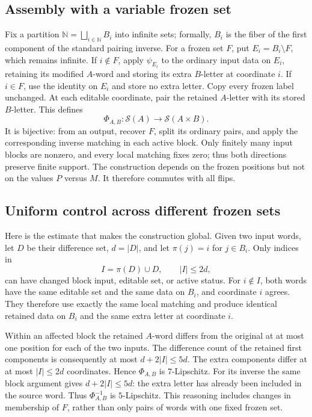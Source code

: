 \documentclass[11pt]{article}
\newcommand{\N}{\mathbb N}
\begin{document}
\subsection{Assembly with a variable frozen set}
Fix a partition $\N=\bigsqcup_{i\in\N}B_i$ into infinite sets; formally,
$B_i$ is the fiber of the first component of the standard pairing inverse.
For a frozen set $F$, put $E_i=B_i\setminus F$, which remains infinite.
If $i\notin F$, apply $\psi_{E_i}$ to the ordinary input data on $E_i$,
retaining its modified $A$-word and storing its extra $B$-letter at
coordinate $i$. If $i\in F$, use the identity on $E_i$ and store no extra
letter. Copy every frozen label unchanged. At each editable coordinate,
pair the retained $A$-letter with its stored $B$-letter. This defines
\[
 \Phi_{A,B}:\mathcal S(A)\longrightarrow\mathcal S(A\times B).
\]
It is bijective: from an output, recover $F$, split its ordinary pairs,
and apply the corresponding inverse matching in each active block.
Only finitely many input blocks are nonzero, and every local matching fixes
zero; thus both directions preserve finite support. The construction
depends on the frozen positions but not on the values $P$ versus $M$.
It therefore commutes with all flips.

\subsection{Uniform control across different frozen sets}
Here is the estimate that makes the construction global. Given two input
words, let $D$ be their difference set, $d=|D|$, and let $\pi(j)=i$ for
$j\in B_i$. Only indices in
\[
 I=\pi(D)\cup D,\qquad |I|\le2d,
\]
can have changed block input, editable set, or active status. For $i\notin I$,
both words have the same editable set and the same data on $B_i$, and
coordinate $i$ agrees. They therefore use exactly the same local matching
and produce identical retained data on $B_i$ and the same extra letter
at coordinate $i$.

Within an affected block the retained $A$-word differs from the original
at at most one position for each of the two inputs. The difference count
of the retained first components is consequently at most
$d+2|I|\le5d$. The extra components differ at at most $|I|\le2d$
coordinates. Hence $\Phi_{A,B}$ is $7$-Lipschitz. For its inverse the
same block argument gives $d+2|I|\le5d$: the extra letter has already
been included in the source word. Thus $\Phi_{A,B}^{-1}$ is
$5$-Lipschitz. This reasoning includes changes in membership of $F$,
rather than only pairs of words with one fixed frozen set.
\end{document}
